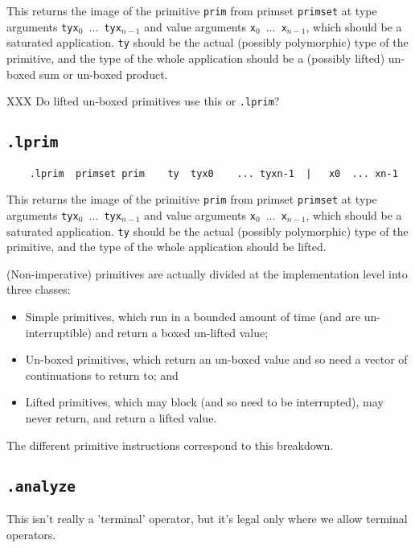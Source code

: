 \documentclass{report}
\newcommand\stringcode[1]{\texttt{#1}}
\begin{document}
This returns the image of the primitive \stringcode{prim} from primset \stringcode{primset} at type arguments \stringcode{tyx$_0$ $\ldots$ tyx$_{n-1}$} and value arguments \stringcode{x$_0$ $\ldots$ x$_{n-1}$},
which should be a saturated application.
\stringcode{ty} should be the actual (possibly polymorphic) type of the primitive,
and the type of the whole application should be a (possibly lifted) un-boxed sum or un-boxed product.

XXX Do lifted un-boxed primitives use this or \stringcode{.lprim}?

\subsection{\stringcode{.lprim}}

\begin{verbatim}
	.lprim	primset	prim	ty	tyx0	...	tyxn-1	|	x0	...	xn-1
\end{verbatim}

This returns the image of the primitive \stringcode{prim} from primset \stringcode{primset} at type arguments \stringcode{tyx$_0$ $\ldots$ tyx$_{n-1}$} and value arguments \stringcode{x$_0$ $\ldots$ x$_{n-1}$},
which should be a saturated application.
\stringcode{ty} should be the actual (possibly polymorphic) type of the primitive,
and the type of the whole application should be lifted.

(Non-imperative) primitives are actually divided at the implementation level into three classes:
\begin{itemize}
    \item Simple primitives, which run in a bounded amount of time (and are un-interruptible) and return a boxed un-lifted value;
    \item Un-boxed primitives, which return an un-boxed value and so need a vector of continuations to return to; and
    \item Lifted primitives, which may block (and so need to be interrupted), may never return, and return a lifted value.
\end{itemize}
The different primitive instructions correspond to this breakdown.

\subsection{\stringcode{.analyze}}

This isn't really a 'terminal' operator, but it's legal only where we allow terminal operators.
\end{document}
